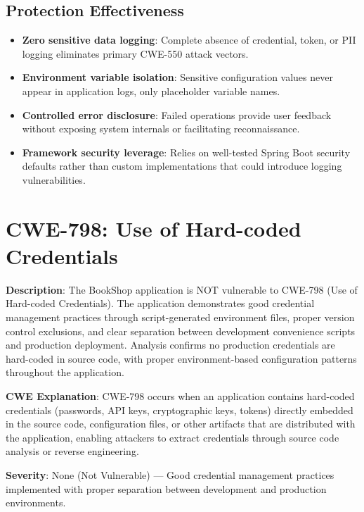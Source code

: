 \documentclass[]{UCD_CS_FYP_Report}
\begin{document}
\subsection{Protection Effectiveness}
\begin{itemize}
	\item \textbf{Zero sensitive data logging}: Complete absence of credential, token, or PII logging eliminates primary CWE-550 attack vectors.
	\item \textbf{Environment variable isolation}: Sensitive configuration values never appear in application logs, only placeholder variable names.
	\item \textbf{Controlled error disclosure}: Failed operations provide user feedback without exposing system internals or facilitating reconnaissance.
	\item \textbf{Framework security leverage}: Relies on well-tested Spring Boot security defaults rather than custom implementations that could introduce logging vulnerabilities.
\end{itemize}



\section{CWE-798: Use of Hard-coded Credentials}

\textbf{Description}: The BookShop application is NOT vulnerable to CWE-798 (Use of Hard-coded Credentials). The application demonstrates good credential management practices through script-generated environment files, proper version control exclusions, and clear separation between development convenience scripts and production deployment. Analysis confirms no production credentials are hard-coded in source code, with proper environment-based configuration patterns throughout the application.

\textbf{CWE Explanation}: CWE-798 occurs when an application contains hard-coded credentials (passwords, API keys, cryptographic keys, tokens) directly embedded in the source code, configuration files, or other artifacts that are distributed with the application, enabling attackers to extract credentials through source code analysis or reverse engineering.

\textbf{Severity}: None (Not Vulnerable) — Good credential management practices implemented with proper separation between development and production environments.
\end{document}
